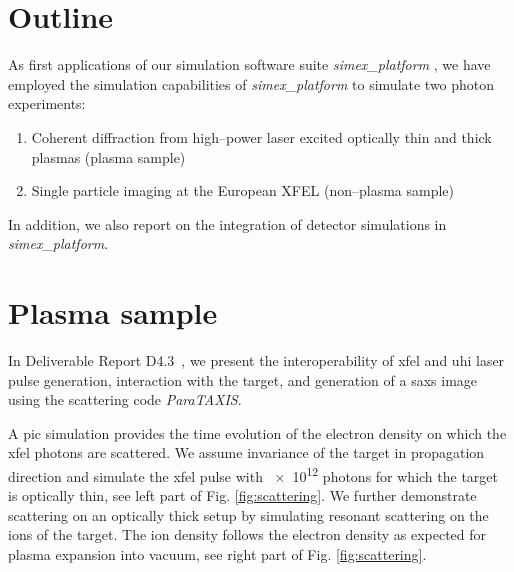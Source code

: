 \documentclass[10pt]{scrartcl}
\begin{document}

\section{Outline}
%
As first applications of our simulation software suite \textit{simex\_platform}
\cite{simex_github, Fortmann-Grote2017a, EUCALL_SIMEX_D4.3}, we have employed the simulation capabilities of
\textit{simex\_platform} \cite{simex_github} to simulate two photon experiments:
\begin{enumerate}
  \item Coherent diffraction from high--power laser excited optically thin and
    thick plasmas (plasma sample)
  \item Single particle imaging at the European XFEL (non--plasma sample)
\end{enumerate}
%
In addition, we also report on the integration of detector simulations in
\textit{simex\_platform}.

\section{Plasma sample}
%
In Deliverable Report D4.3~\cite{EUCALL_SIMEX_D4.3}, we present the interoperability of \gls{xfel} and \gls{uhi} laser pulse generation,
interaction with the target, and generation of a \gls{saxs} image using the
scattering code \textit{ParaTAXIS}.

A \gls{pic} simulation provides the time
evolution of the electron density on which the \gls{xfel} photons are scattered. We
assume invariance of the target in propagation direction and simulate the \gls{xfel}
pulse with \num{e12} photons for which the target is optically thin,
see left part of Fig. \ref{fig:scattering}. We further demonstrate
scattering on an optically thick setup by simulating
resonant scattering on the ions of the target. The ion density follows the
electron density as expected for plasma expansion into vacuum\cite{Mora2003},
see right part of Fig. \ref{fig:scattering}.
\end{document}

